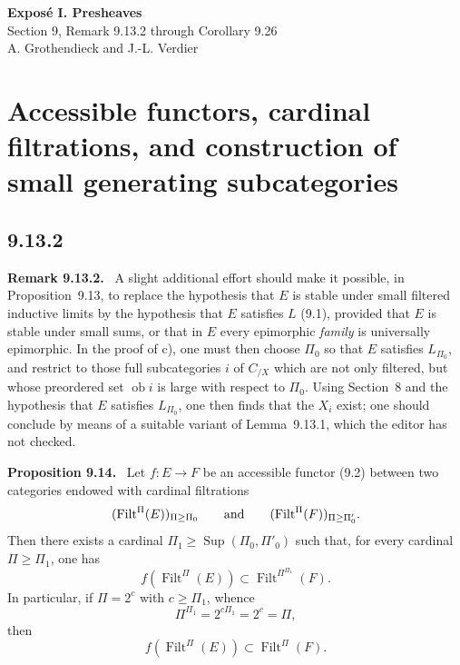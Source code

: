\documentclass[11pt]{article}
\newcommand{\ob}{\operatorname{ob}}
\newcommand{\Filt}{\operatorname{Filt}}
\newcommand{\Sup}{\operatorname{Sup}}
\newenvironment{statement}[1]{\par\medskip\noindent\textbf{#1.}\ }{\par\medskip}
\newenvironment{remarktext}[1]{\par\medskip\noindent\textbf{#1.}\ }{\par\medskip}
\begin{document}
\begin{center}
{\Large \textbf{Expos\'e I. Presheaves}}\\[0.35em]
{\large Section 9, Remark 9.13.2 through Corollary 9.26}\\[0.35em]
A. Grothendieck and J.-L. Verdier
\end{center}

\bigskip


\setcounter{section}{8}
\section{Accessible functors, cardinal filtrations, and construction of small generating subcategories}

\setcounter{subsection}{13}
\subsection*{9.13.2}

\begin{remarktext}{Remark 9.13.2}
A slight additional effort should make it possible, in Proposition~9.13, to replace the hypothesis that $E$ is stable under small filtered inductive limits by the hypothesis that $E$ satisfies $L$ (9.1), provided that $E$ is stable under small sums, or that in $E$ every epimorphic \emph{family} is universally epimorphic. In the proof of c), one must then choose $\Pi_0$ so that $E$ satisfies $L_{\Pi_0}$, and restrict to those full subcategories $i$ of $C_{/X}$ which are not only filtered, but whose preordered set $\ob i$ is large with respect to $\Pi_0$. Using Section~8 and the hypothesis that $E$ satisfies $L_{\Pi_0}$, one then finds that the $X_i$ exist; one should conclude by means of a suitable variant of Lemma~9.13.1, which the editor has not checked.
\end{remarktext}

\begin{statement}{Proposition 9.14}
Let $f:E\to F$ be an accessible functor (9.2) between two categories endowed with cardinal filtrations
\[
(\Filt^\Pi(E))_{\Pi\geq\Pi_0}\qquad\hbox{and}\qquad
(\Filt^\Pi(F))_{\Pi\geq\Pi'_0}.
\]
Then there exists a cardinal $\Pi_1\geq \Sup(\Pi_0,\Pi'_0)$ such that, for every cardinal $\Pi\geq \Pi_1$, one has
\begin{equation}
 f(\Filt^\Pi(E))\subset \Filt^{\Pi^{\Pi_1}}(F).
 \tag{9.14.1}
\end{equation}
In particular, if $\Pi=2^c$ with $c\geq \Pi_1$, whence
\[
 \Pi^{\Pi_1}=2^{c\Pi_1}=2^c=\Pi,
\]
then
\begin{equation}
 f(\Filt^\Pi(E))\subset \Filt^\Pi(F).
 \tag{9.14.2}
\end{equation}
\end{statement}
\end{document}
